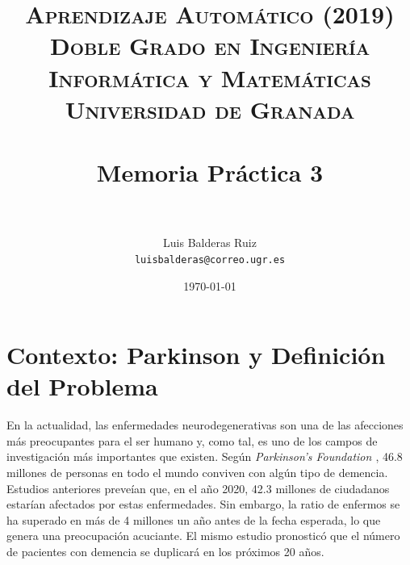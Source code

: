 
\graphicspath{ {./images/} }
\usepackage{subcaption}
\usepackage{hyperref}
\usepackage{soul}
\usepackage{amssymb}



\title{	
	\normalfont \normalsize 
	\textsc{\textbf{Aprendizaje Automático (2019)} \\ Doble Grado en Ingeniería Informática y Matemáticas \\ Universidad de Granada} \\ [25pt] %
	\horrule{0.5pt} \\[0.4cm] %
	\huge Memoria Práctica 3 \\ %
	\horrule{2pt} \\[0.5cm] %
}

\author{Luis Balderas Ruiz \\ \texttt{luisbalderas@correo.ugr.es}} 


\date{\normalsize\today} %



	
	\maketitle %
	
	\newpage %
	
	\tableofcontents %
	
	\listoffigures
	
	\listoftables
	
	\newpage




\section{Contexto: Parkinson y Definición del Problema}

En la actualidad, las enfermedades neurodegenerativas son una de las afecciones más preocupantes para el ser humano y, como tal, es uno de los campos de investigación más importantes que existen. Según \textit{Parkinson's Foundation \cite{pf}}, 46.8 millones de personas en todo el mundo conviven con algún tipo de demencia. Estudios anteriores preveían que, en el año 2020, 42.3 millones de ciudadanos estarían afectados por estas enfermedades. Sin embargo, la ratio de enfermos se ha superado en más de 4 millones un año antes de la fecha esperada, lo que genera una preocupación acuciante. El mismo estudio pronosticó que el número de pacientes con demencia se duplicará en los próximos 20 años. \\

